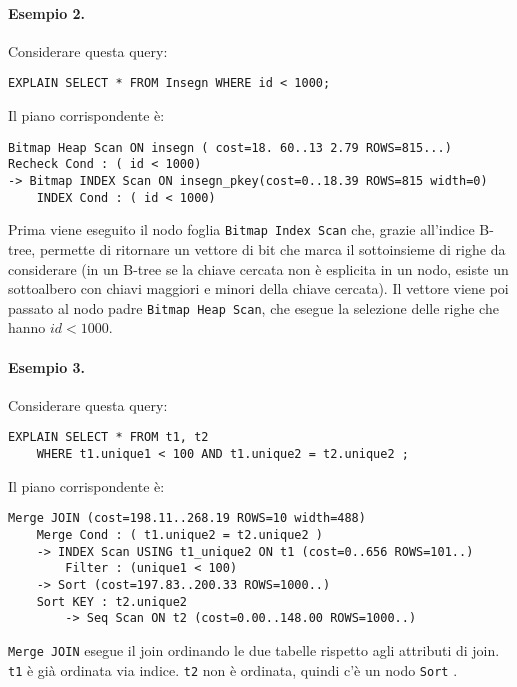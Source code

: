 \documentclass[a4paper, 10pt, titlepage]{article}
\begin{document}
	\paragraph{Esempio 2.} 
	Considerare questa query:
	\begin{lstlisting}
EXPLAIN SELECT * FROM Insegn WHERE id < 1000;
	\end{lstlisting}
	Il piano corrispondente è:
	\begin{lstlisting}
Bitmap Heap Scan ON insegn ( cost=18. 60..13 2.79 ROWS=815...)
Recheck Cond : ( id < 1000)
-> Bitmap INDEX Scan ON insegn_pkey(cost=0..18.39 ROWS=815 width=0)
	INDEX Cond : ( id < 1000)
	\end{lstlisting}
	Prima viene eseguito il nodo foglia \lstinline|Bitmap Index Scan| che, grazie all'indice B-tree, permette di ritornare un vettore di bit che marca il sottoinsieme di righe da considerare (in un B-tree se la chiave cercata non è esplicita in un nodo, esiste un sottoalbero con chiavi maggiori e minori della chiave cercata). Il vettore viene poi passato al nodo padre \lstinline|Bitmap Heap Scan|, che esegue la selezione delle righe che hanno $id < 1000$. 
	
	\paragraph{Esempio 3.}
		Considerare questa query:
	\begin{lstlisting}
EXPLAIN SELECT * FROM t1, t2
	WHERE t1.unique1 < 100 AND t1.unique2 = t2.unique2 ;
	\end{lstlisting}
	Il piano corrispondente è:
	\begin{lstlisting}
Merge JOIN (cost=198.11..268.19 ROWS=10 width=488)
	Merge Cond : ( t1.unique2 = t2.unique2 )
	-> INDEX Scan USING t1_unique2 ON t1 (cost=0..656 ROWS=101..)
		Filter : (unique1 < 100)
	-> Sort (cost=197.83..200.33 ROWS=1000..)
	Sort KEY : t2.unique2
		-> Seq Scan ON t2 (cost=0.00..148.00 ROWS=1000..)
	\end{lstlisting} \medskip
\lstinline|Merge JOIN| esegue il join ordinando le due tabelle rispetto agli attributi di join. \lstinline|t1| è già ordinata via indice.
\lstinline|t2| non è ordinata, quindi c’è un nodo \lstinline|Sort| .\medskip
\end{document}
